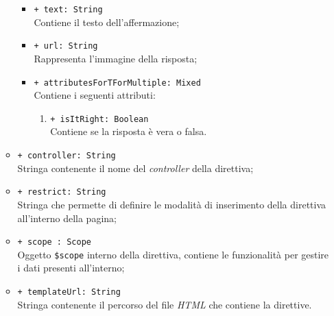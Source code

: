 \begin{itemize}
\begin{itemize}
\begin{itemize}
					\item \texttt{+ text: String} \\ Contiene il testo dell'affermazione;
					\item \texttt{+ url: String} \\ Rappresenta l'immagine della risposta;
					\item \texttt{+ attributesForTForMultiple: Mixed} \\ Contiene i seguenti attributi:
					\begin{enumerate}
						\item \texttt{+ isItRight: Boolean} \\ Contiene se la risposta è vera o falsa.
					\end{enumerate}
				\end{itemize}
				\item \texttt{+ controller: String} \\ Stringa contenente il nome del \textit{controller} della direttiva;
				\item \texttt{+ restrict: String} \\ Stringa che permette di definire le modalità di inserimento della direttiva all'interno della pagina;
				\item \texttt{+ scope : Scope} \\Oggetto \texttt{\$scope} interno della direttiva, contiene le funzionalità per gestire i dati presenti all'interno;
				\item \texttt{+ templateUrl: String} \\ Stringa contenente il percorso del file \textit{HTML} che contiene la direttive.
			\end{itemize}
		\end{itemize}